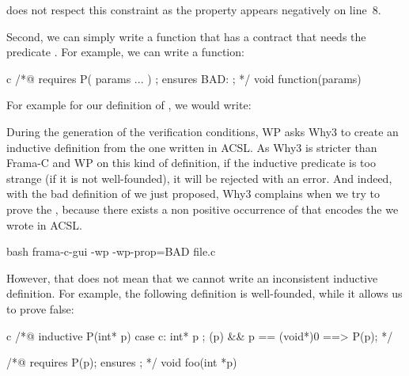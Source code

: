 
does not respect this constraint as the property 
appears negatively on line~8.

Second, we can simply write a function that has a contract that needs the
predicate . For example, we can write a function:



\begin{CodeBlock}{c}
/*@
  requires P( params ... ) ;
  ensures  BAD: \false ;
*/ void function(params){

}
\end{CodeBlock}



For example for our definition of , we would write:






During the generation of the verification conditions, WP asks Why3 to create an
inductive definition from the one written in ACSL. As Why3 is stricter than
Frama-C and WP on this kind of definition, if the inductive predicate is too
strange (if it is not well-founded), it will be rejected with an error. And
indeed, with the bad definition of  we just proposed,
Why3 complains when we try to prove the
, because there exists a non
positive occurrence of  that encodes the
 we wrote in ACSL.

\begin{CodeBlock}{bash}
frama-c-gui -wp -wp-prop=BAD file.c
\end{CodeBlock}





However, that does not mean that we cannot write an inconsistent inductive
definition. For example, the following definition is well-founded, while it
allows us to prove false:


\begin{CodeBlock}{c}
/*@ inductive P(int* p){
      case c: \forall int* p ; \valid(p) && p == (void*)0 ==> P(p);
    }
*/

/*@ requires P(p);
    ensures \false ; */
void foo(int *p){}
\end{CodeBlock}


